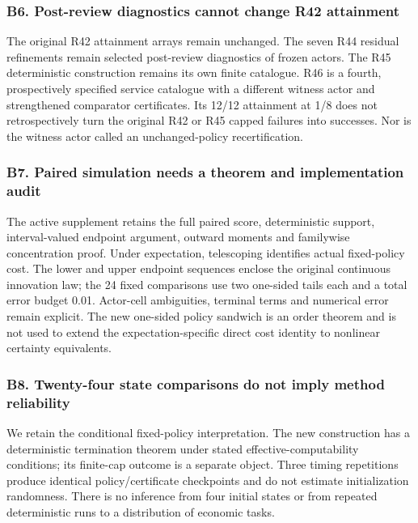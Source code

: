 \documentclass[ecta,nameyear,draft]{econsocart}
\begin{document}
\hypertarget{b6-post-review-diagnostics-cannot-change-r42-attainment}{%
\subsubsection{B6. Post-review diagnostics cannot change R42
attainment}\label{b6-post-review-diagnostics-cannot-change-r42-attainment}}

The original R42 attainment arrays remain unchanged. The seven R44
residual refinements remain selected post-review diagnostics of frozen
actors. The R45 deterministic construction remains its own finite
catalogue. R46 is a fourth, prospectively specified service catalogue
with a different witness actor and strengthened comparator certificates.
Its 12/12 attainment at 1/8 does not retrospectively turn the original
R42 or R45 capped failures into successes. Nor is the witness actor
called an unchanged-policy recertification.

\hypertarget{b7-paired-simulation-needs-a-theorem-and-implementation-audit}{%
\subsubsection{B7. Paired simulation needs a theorem and implementation
audit}\label{b7-paired-simulation-needs-a-theorem-and-implementation-audit}}

The active supplement retains the full paired score, deterministic
support, interval-valued endpoint argument, outward moments and
familywise concentration proof. Under expectation, telescoping
identifies actual fixed-policy cost. The lower and upper endpoint
sequences enclose the original continuous innovation law; the 24 fixed
comparisons use two one-sided tails each and a total error budget 0.01.
Actor-cell ambiguities, terminal terms and numerical error remain
explicit. The new one-sided policy sandwich is an order theorem and is
not used to extend the expectation-specific direct cost identity to
nonlinear certainty equivalents.

\hypertarget{b8-twenty-four-state-comparisons-do-not-imply-method-reliability}{%
\subsubsection{B8. Twenty-four state comparisons do not imply method
reliability}\label{b8-twenty-four-state-comparisons-do-not-imply-method-reliability}}

We retain the conditional fixed-policy interpretation. The new
construction has a deterministic termination theorem under stated
effective-computability conditions; its finite-cap outcome is a separate
object. Three timing repetitions produce identical policy/certificate
checkpoints and do not estimate initialization randomness. There is no
inference from four initial states or from repeated deterministic runs
to a distribution of economic tasks.
\end{document}
